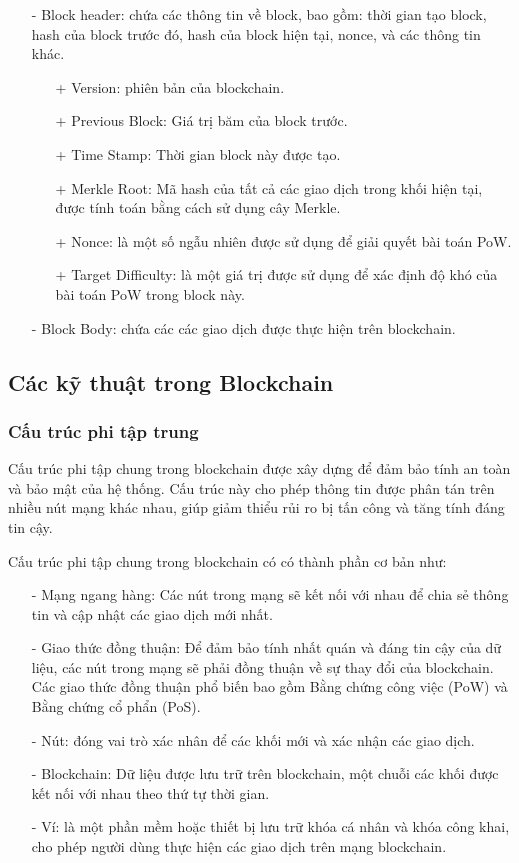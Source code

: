 \begin{itemize}
    \item[-] Block header: chứa các thông tin về block, bao gồm: thời gian tạo block, hash của block trước đó, hash của block hiện tại, nonce, và các thông tin khác.
    \begin{itemize}
        \item[+] Version: phiên bản của blockchain.
        \item[+] Previous Block: Giá trị băm của block trước.
        \item[+] Time Stamp: Thời gian block này được tạo.
        \item[+] Merkle Root: Mã hash của tất cả các giao dịch trong khối hiện tại, 
        được tính toán bằng cách sử dụng cây Merkle.
        \item[+] Nonce: là một số ngẫu nhiên được sử dụng để giải quyết bài toán PoW.
        \item[+] Target Difficulty: là một giá trị được sử dụng để xác định độ khó của bài toán PoW trong block này.
    \end{itemize}
    \item[-] Block Body: chứa các các giao dịch được thực hiện trên blockchain.
\end{itemize}

\subsection{Các kỹ thuật trong Blockchain}
\subsubsection{Cấu trúc phi tập trung}
Cấu trúc phi tập chung trong blockchain được xây dựng 
để đảm bảo tính an toàn và bảo mật của hệ thống. Cấu trúc này cho phép thông tin được phân tán trên nhiều nút mạng khác nhau, giúp giảm thiểu rủi ro bị tấn công và tăng tính đáng tin cậy.

Cấu trúc phi tập chung trong blockchain có có thành phần cơ bản như:
\begin{itemize}
    \item[-] Mạng ngang hàng: Các nút trong mạng sẽ kết 
    nối với nhau để chia sẻ thông tin và cập nhật các giao dịch mới nhất.
    \item[-] Giao thức đồng thuận: Để đảm bảo tính nhất 
    quán và đáng tin cậy của dữ liệu, các nút trong mạng sẽ phải đồng thuận về 
    sự thay đổi của blockchain. Các giao thức đồng thuận phổ biến bao gồm Bằng chứng công việc (PoW)
     và Bằng chứng cổ phẩn (PoS).
    \item[-] Nút: đóng vai trò xác nhân để các khối mới và xác nhận các giao dịch.
    \item[-] Blockchain: Dữ liệu được lưu trữ trên blockchain, một chuỗi
    các khối được kết nối với nhau theo thứ tự thời gian.
    \item[-] Ví: là một phần mềm hoặc thiết bị lưu trữ khóa cá nhân và
    khóa công khai, cho phép người dùng thực hiện các giao dịch trên mạng
    blockchain.
\end{itemize}

